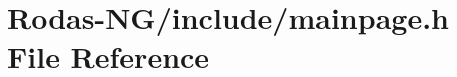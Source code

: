\hypertarget{Rodas-NG_2include_2mainpage_8h}{\section{Rodas-\/\-N\-G/include/mainpage.h File Reference}
\label{Rodas-NG_2include_2mainpage_8h}
}
